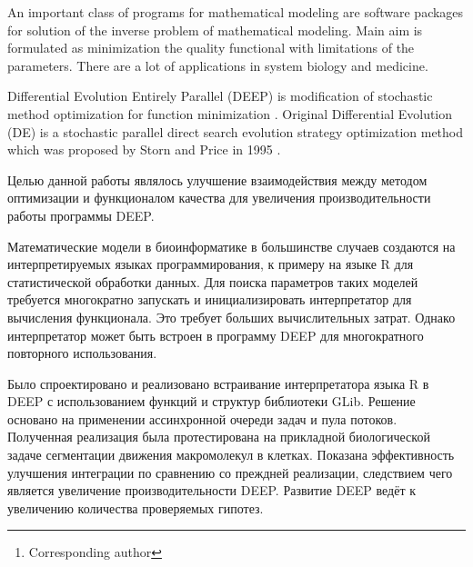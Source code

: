 \documentclass[12pt, a4paper]{article} %
\begin{document}

\renewcommand{\abstractname}{\large
    Method development of Differential Evolution
    for search mathematical model's options}
\begin{abstract}
    \normalsize %
    \bigskip %
    \noindent A.~V.~Svichkarev\footnote[*]{Corresponding author}, K.~N.~Kozlov \\
    \noindent
    System biology and bioinformatics lab, IAMM,
    Peter the Great St.Petersburg Polytechnic University,
St.Petersburg, Russia \\
    \noindent e-mail: tolik0393@bionet.nsc.ru \\
\end{abstract}

An important class of programs
for mathematical modeling are
software packages for solution
of the inverse problem of mathematical modeling.
Main aim is formulated as
minimization the quality functional
with limitations of the parameters.
There are a lot of applications
in system biology and medicine.

Differential Evolution Entirely Parallel (DEEP)
is modification of stochastic method optimization
for function minimization \cite{Kozlov11}.
Original Differential Evolution (DE)
is a stochastic parallel direct search
evolution strategy optimization method
which was proposed by Storn and Price in 1995 \cite{Storn95}. 

Целью данной работы являлось улучшение взаимодействия
между методом оптимизации
и функционалом качества
для увеличения производительности
работы программы DEEP.

Математические модели в биоинформатике
в большинстве случаев создаются
на интерпретируемых языках программирования,
к примеру на языке R для статистической обработки данных.
Для поиска параметров таких моделей
требуется многократно запускать
и инициализировать интерпретатор
для вычисления функционала.
Это требует больших вычислительных затрат.
Однако интерпретатор может быть встроен
в программу DEEP для
многократного повторного использования.

Было спроектировано и реализовано
встраивание интерпретатора языка R
в DEEP с использованием
функций и структур библиотеки GLib.
Решение основано на применении
ассинхронной очереди задач и пула потоков.
Полученная реализация была
протестирована на прикладной биологической задаче
сегментации движения макромолекул в клетках.
Показана эффективность улучшения интеграции
по сравнению со преждней реализации,
следствием чего является
увеличение производительности DEEP.
Развитие DEEP ведёт к увеличению
количества проверяемых гипотез.

\vfill %
\end{document}
